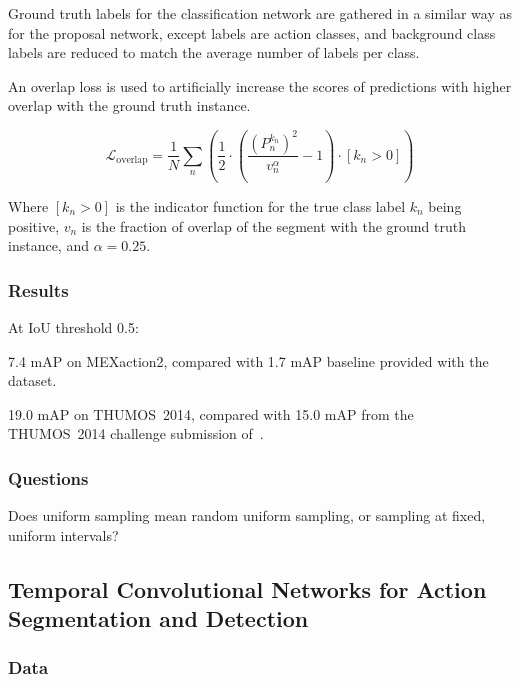 \documentclass[a4paper, 12pt]{article}
\begin{document}
Ground truth labels for the classification network are gathered in a similar
way as for the proposal network, except labels are action classes, and
background class labels are reduced to match the average number of labels per
class.

An overlap loss is used to artificially increase the scores of predictions with
higher overlap with the ground truth instance.

\begin{equation}
        \mathcal{L}_{\textrm{overlap}} = \frac{1}{N} \sum_n
                \left(\frac{1}{2} \cdot
                        \left(
                                \frac{{\left( P_n^{k_n} \right)}^2}{v_n^\alpha}
                                - 1
                        \right)
                        \cdot \left[ k_n > 0 \right]
                \right)
\end{equation}

Where $\left[ k_n > 0 \right]$ is the indicator function for the true class
label $k_n$ being positive, $v_n$ is the fraction of overlap of the segment
with the ground truth instance, and $\alpha = 0.25$.

\subsubsection{Results}

At IoU threshold 0.5:

7.4 mAP on MEXaction2, compared with 1.7 mAP baseline provided with the
dataset.

19.0 mAP on THUMOS~2014, compared with 15.0 mAP from the THUMOS~2014 challenge
submission of~\citet{LearSubmissionThumos2014}.

\subsubsection{Questions}

Does uniform sampling mean random uniform sampling, or sampling at fixed,
uniform intervals?


\subsection{Temporal Convolutional Networks for Action Segmentation and
            Detection\citet{DBLP:journals/corr/LeaFVRH16}}

\subsubsection{Data}
\end{document}
